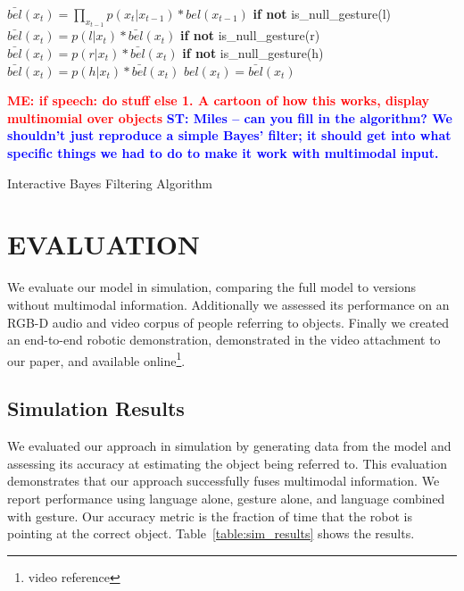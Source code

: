 \documentclass[letterpaper, 10 pt, conference]{ieeeconf}
\newcommand{\stnote}[1]{\textcolor{Blue}{\textbf{ST: #1}}}
\newcommand{\menote}[1]{\textcolor{Red}{\textbf{ME: #1}}}
\begin{document}
\begin{algorithm}
    \DontPrintSemicolon
    \KwIn{$bel(x_{t-1}), u_t, z_t$ \menote{What is $u_t$?}}
    \BlankLine
    \BlankLine
     {
      $\bar{bel}(x_t) = \displaystyle\prod_{x_{t-1}} p(x_t|x_{t-1})*bel(x_{t-1})$
      \BlankLine
      \textbf{if not} is\_null\_gesture(l)
      \BlankLine
      \Indp$\bar{bel}(x_t) = p(l | x_t) *  \bar{bel}(x_t)$
      \BlankLine
      \Indm\textbf{if not} is\_null\_gesture(r)
      \BlankLine
      \Indp$\bar{bel}(x_t) = p(r | x_t) *  \bar{bel}(x_t)$
      \BlankLine
      \Indm\textbf{if not} is\_null\_gesture(h)
      \BlankLine
      \Indp$\bar{bel}(x_t) = p(h | x_t) *  \bar{bel}(x_t)$
      \BlankLine
      \Indm{}
      $bel(x_t) = \bar{bel}(x_t)$

    }
    \BlankLine
    \menote{if speech: do stuff else 1. A cartoon of how this works, display multinomial over objects}
      \stnote{Miles -- can you fill in the algorithm?  We shouldn't just reproduce a simple Bayes' filter; it should get into what specific things we had to do to make it work with multimodal input.}
\caption{Interactive Bayes Filtering Algorithm} 
\label{alg:algorithm}
\end{algorithm}



\section{EVALUATION}

We evaluate our model in simulation, comparing the full model to
versions without multimodal information.  Additionally we assessed its
performance on an RGB-D audio and video corpus of people referring to
objects.  Finally we created an end-to-end robotic demonstration,
demonstrated in the video attachment to our paper, and available
online\footnote{video reference}. 

\subsection{Simulation Results}

We evaluated our approach in simulation by generating data from the
model and assessing its accuracy at estimating the object being
referred to.  This evaluation demonstrates that our approach
successfully fuses multimodal information.  We report performance
using language alone, gesture alone, and language combined with
gesture.  Our accuracy metric is the fraction of time that the robot
is pointing at the correct object.  Table~\ref{table:sim_results}
shows the results.
\end{document}
